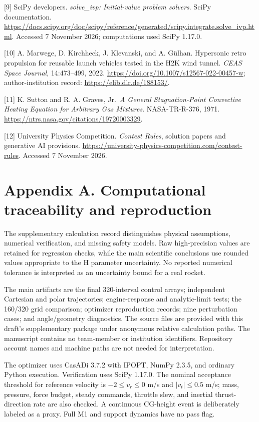 \documentclass[
  11pt,
  a4paper,
]{article}
\begin{document}
{[}9{]} SciPy developers. \emph{solve\_ivp: Initial-value problem
solvers}. SciPy documentation.
\url{https://docs.scipy.org/doc/scipy/reference/generated/scipy.integrate.solve_ivp.html}.
Accessed 7 November 2026; computations used SciPy 1.17.0.

{[}10{]} A. Marwege, D. Kirchheck, J. Klevanski, and A. Gülhan.
Hypersonic retro propulsion for reusable launch vehicles tested in the
H2K wind tunnel. \emph{CEAS Space Journal}, 14:473--499, 2022.
\url{https://doi.org/10.1007/s12567-022-00457-w}; author-institution
record: \url{https://elib.dlr.de/188153/}.

{[}11{]} K. Sutton and R. A. Graves, Jr.~\emph{A General
Stagnation-Point Convective Heating Equation for Arbitrary Gas
Mixtures}. NASA-TR-R-376, 1971.
\url{https://ntrs.nasa.gov/citations/19720003329}.

{[}12{]} University Physics Competition. \emph{Contest Rules}, solution
papers and generative AI provisions.
\url{https://university-physics-competition.com/contest-rules}. Accessed
7 November 2026.

\section*{Appendix A. Computational traceability and
reproduction}\label{appendix-a.-computational-traceability-and-reproduction}

The supplementary calculation record distinguishes physical assumptions,
numerical verification, and missing safety models. Raw high-precision
values are retained for regression checks, while the main scientific
conclusions use rounded values appropriate to the H parameter
uncertainty. No reported numerical tolerance is interpreted as an
uncertainty bound for a real rocket.

The main artifacts are the final 320-interval control arrays;
independent Cartesian and polar trajectories; engine-response and
analytic-limit tests; the 160/320 grid comparison; optimizer
reproduction records; nine perturbation cases; and angle/geometry
diagnostics. The source files are provided with this draft's
supplementary package under anonymous relative calculation paths. The
manuscript contains no team-member or institution identifiers.
Repository account names and machine paths are not needed for
interpretation.

The optimizer uses CasADi 3.7.2 with IPOPT, NumPy 2.3.5, and ordinary
Python execution. Verification uses SciPy 1.17.0. The nominal acceptance
threshold for reference velocity is \(-2\le v_r\le0\) m/s and
\(|v_t|\le0.5\) m/s; mass, pressure, force budget, steady commands,
throttle slew, and inertial thrust-direction rate are also checked. A
continuous CG-height event is deliberately labeled as a proxy. Full M1
and support dynamics have no pass flag.
\end{document}
